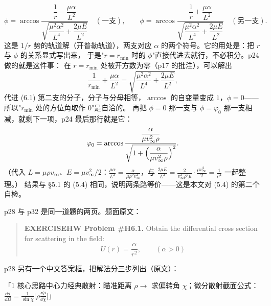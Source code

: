 \documentclass[11pt]{ctexart}
\begin{document}
\[
\phi=\arccos\frac{\dfrac1r-\dfrac{\mu\alpha}{L^{2}}}{\sqrt{\dfrac{\mu^{2}\alpha^{2}}{L^{4}}+\dfrac{2\mu E}{L^{2}}}}\quad(\text{一支}),\qquad
\phi=\arccos\frac{\dfrac1r+\dfrac{\mu\alpha}{L^{2}}}{\sqrt{\dfrac{\mu^{2}\alpha^{2}}{L^{4}}+\dfrac{2\mu E}{L^{2}}}}\quad(\text{另一支}) . \tag{6.1}
\]
这是 $1/r$ 势的轨道解（开普勒轨道），两支对应 $\alpha$ 的两个符号。它的用处是：把 $r$ 与 $\phi$ 的关系显式写出来，
于是"$r=r_{\min}$ 时的 $\phi$"直接代进去就行，不必积分。p24 做的就是这件事：
在 $r=r_{\min}$ 处被开方数为零（p17 的批注），可以解出
\[
\frac1{r_{\min}}+\frac{\mu\alpha}{L^{2}}=\sqrt{\frac{\mu^{2}\alpha^{2}}{L^{4}}+\frac{2\mu E}{L^{2}}} , \tag{6.2}
\]
代进 (6.1) 第二支的分子，分子与分母相等，$\arccos$ 的自变量变成 $1$，$\phi=0$——所以"$r_{\min}$ 处的方位角取作 $0$"是自洽的。
再把 $\phi=0$ 那一支与 $\phi=\varphi_0$ 那一支相减，就剩下一项，p24 最后那行就是它：
\[
\varphi_0=\arccos\frac{\dfrac{\alpha}{\mu v_\infty^{2}\rho}}{\sqrt{1+\Bigl(\dfrac{\alpha}{\mu v_\infty^{2}\rho}\Bigr)^{2}}} .
\]
（代入 $L=\mu\rho v_\infty$、$E=\mu v_\infty^2/2$：$\frac{\mu\alpha}{L^{2}}=\frac{\alpha}{\mu\rho^{2}v_\infty^{2}}$，与 $\frac{2\mu E}{L^{2}}=\frac{2}{v_\infty^{2}\rho^{2}\mu}\cdot\frac{\mu v_\infty^{2}}{2}=\frac{1}{\rho^{2}}$ 一起整理。）
结果与 §5.1 的 (5.4) 相同，说明两条路等价——这是本文对 (5.4) 的第二个自检。




p28 与 p32 是同一道题的两页。题面原文：

\begin{quote}
\textbf{EXERCISE}\quad \textbf{HW Problem \#H6.1.} Obtain the differential cross section for scattering in the field:
\[
U(r)=\frac{\alpha}{r^{2}},\qquad(\alpha>0)
\]
\end{quote}

p28 另有一个中文答案框，把解法分三步列出（原文）：

「1 核心思路\quad 中心力经典散射：瞄准距离 $\rho\to$ 求偏转角 $\chi$；微分散射截面公式：$\frac{\dd\sigma}{\dd\Omega}=\frac{1}{\sin\chi}\bigl|\rho\frac{\dd\rho}{\dd\chi}\bigr|$」
\end{document}
